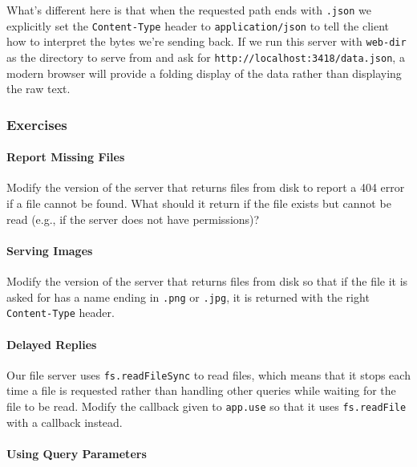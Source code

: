 What's different here is that when the requested path ends with
\texttt{.json} we explicitly set the \texttt{Content-Type} header to
\texttt{application/json} to tell the client how to interpret the bytes
we're sending back. If we run this server with \texttt{web-dir} as the
directory to serve from and ask for
\texttt{http://localhost:3418/data.json}, a modern browser will provide
a folding display of the data rather than displaying the raw text.

\subsubsection{Exercises}\label{s:server-exercises}

\paragraph{Report Missing Files}\label{report-missing-files}

Modify the version of the server that returns files from disk to report
a 404 error if a file cannot be found. What should it return if the file
exists but cannot be read (e.g., if the server does not have
permissions)?

\paragraph{Serving Images}\label{serving-images}

Modify the version of the server that returns files from disk so that if
the file it is asked for has a name ending in \texttt{.png} or
\texttt{.jpg}, it is returned with the right \texttt{Content-Type}
header.

\paragraph{Delayed Replies}\label{delayed-replies}

Our file server uses \texttt{fs.readFileSync} to read files, which means
that it stops each time a file is requested rather than handling other
queries while waiting for the file to be read. Modify the callback given
to \texttt{app.use} so that it uses \texttt{fs.readFile} with a callback
instead.

\paragraph{Using Query Parameters}\label{using-query-parameters}

